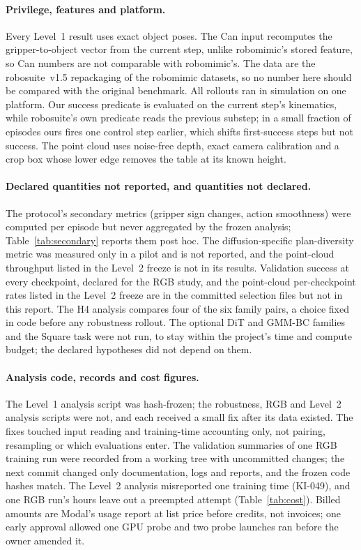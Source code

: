 \paragraph{Privilege, features and platform.} Every Level~1 result uses exact object poses.
The Can input recomputes the gripper-to-object vector from the current step, unlike
robomimic's stored feature, so Can numbers are not comparable with robomimic's. The data are
the robosuite~v1.5 repackaging of the robomimic datasets, so no number here should be compared
with the original benchmark. All rollouts ran in simulation on one platform. Our success
predicate is evaluated on the current step's kinematics, while robosuite's own predicate reads
the previous substep; in a small fraction of episodes ours fires one control step earlier,
which shifts first-success steps but not success. The point cloud uses noise-free depth, exact
camera calibration and a crop box whose lower edge removes the table at its known height.

\paragraph{Declared quantities not reported, and quantities not declared.} The protocol's
secondary metrics (gripper sign changes, action smoothness) were computed per episode but
never aggregated by the frozen analysis; Table~\ref{tab:secondary} reports them post hoc. The diffusion-specific plan-diversity metric was measured only in a pilot and is not
reported, and the point-cloud throughput listed in the Level~2 freeze is not in its results.
Validation success at every checkpoint, declared for the RGB study, and the point-cloud
per-checkpoint rates listed in the Level~2 freeze are in the committed selection files but
not in this report. The H4 analysis
compares four of the six family pairs, a choice fixed in code before any robustness rollout.
The optional DiT and GMM-BC families and the Square task were not run, to stay within the
project's time and compute budget; the declared hypotheses did not depend on them.

\paragraph{Analysis code, records and cost figures.} The Level~1 analysis script was
hash-frozen; the robustness, RGB and Level~2 analysis scripts were not, and each received a
small fix after its data existed. The fixes touched input reading and training-time accounting
only, not pairing, resampling or which evaluations enter. The validation summaries of one RGB
training run were recorded from a working tree with uncommitted changes; the next commit
changed only documentation, logs and reports, and the frozen code hashes match. The Level~2 analysis misreported one training time (KI-049), and one RGB run's
hours leave out a preempted attempt (Table~\ref{tab:cost}). Billed amounts are Modal's usage
report at list price before credits, not invoices; one early approval allowed one GPU probe
and two probe launches ran before the owner amended it.

